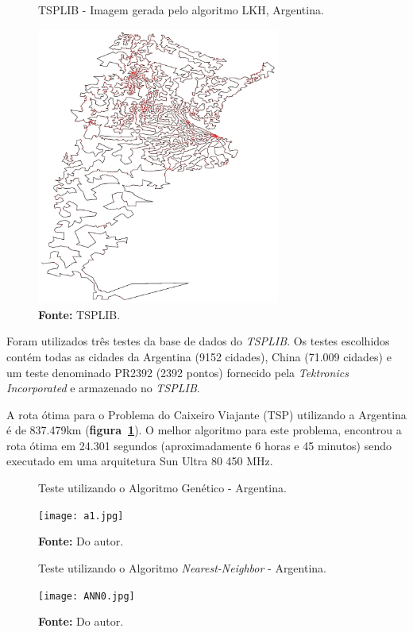\documentclass[12pt,openright,a4paper,twoside]{tcc}
\begin{document}
        \begin{figure}[h]
            \centering
            \caption{TSPLIB - Imagem gerada pelo algoritmo LKH, Argentina.}
            \includegraphics[width = 8cm,keepaspectratio]{img/artour.jpg}
            \caption*{\textbf{Fonte:} TSPLIB.}
            \label{figargentina}
        \end{figure}

		Foram utilizados três testes da base de dados do \textit{TSPLIB}. Os testes escolhidos contém todas as cidades da Argentina (9152 cidades), China (71.009 cidades) e um teste denominado PR2392 (2392 pontos) fornecido pela \textit{Tektronics Incorporated} e armazenado no \textit{TSPLIB}. 
        
        A rota ótima para o Problema do Caixeiro Viajante (TSP) utilizando a Argentina é de 837.479km (\textbf{figura~\ref{figargentina}}). O melhor algoritmo para este problema, encontrou a rota ótima em 24.301 segundos (aproximadamente 6 horas e 45 minutos) sendo executado em uma arquitetura Sun Ultra 80 450 MHz.
        \newpage
        \begin{figure}[h]
            \centering
            \caption{Teste utilizando o Algoritmo Genético - Argentina.}
            \texttt{[image: a1.jpg]}
            \caption*{\textbf{Fonte:} Do autor.}
            \label{figa1}
        \end{figure}

        \begin{figure}[h]
            \centering
            \caption{Teste utilizando o Algoritmo \textit{Nearest-Neighbor} - Argentina.}
            \texttt{[image: ANN0.jpg]}
            \caption*{\textbf{Fonte:} Do autor.}
            \label{figANN0}
        \end{figure}		
\end{document}
